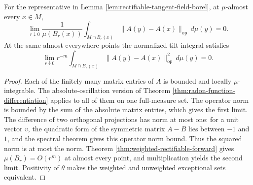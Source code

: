 \begin{proposition}\label{prop:rectifiable-weighted-tangent-oscillation}
For the representative in Lemma \ref{lem:rectifiable-tangent-field-borel}, at $\mu$-almost every $x\in M$,
\[
 \lim_{r\downarrow0}\frac1{\mu(B_r(x))}
       \int_{M\cap B_r(x)}\|A(y)-A(x)\|_{\mathrm{op}}\,d\mu(y)=0.
\]
At the same almost-everywhere points the normalized tilt integral satisfies
\[
 \lim_{r\downarrow0}r^{-m}\int_{M\cap B_r(x)}
       \|A(y)-A(x)\|_{\mathrm{op}}^2\,d\mu(y)=0.
\]
\end{proposition}
\begin{proof}
Each of the finitely many matrix entries of $A$ is bounded and locally $\mu$-integrable. The absolute-oscillation version of Theorem \ref{thm:radon-function-differentiation} applies to all of them on one full-measure set. The operator norm is bounded by the sum of the absolute matrix entries, which gives the first limit. The difference of two orthogonal projections has norm at most one: for a unit vector $v$, the quadratic form of the symmetric matrix $A-B$ lies between $-1$ and $1$, and the spectral theorem gives this operator norm bound. Thus the squared norm is at most the norm. Theorem \ref{thm:weighted-rectifiable-forward} gives $\mu(B_r)=O(r^m)$ at almost every point, and multiplication yields the second limit. Positivity of $\theta$ makes the weighted and unweighted exceptional sets equivalent.
\end{proof}

